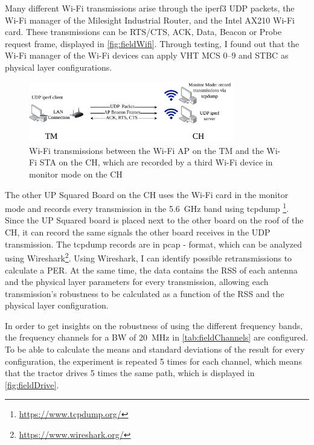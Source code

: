 Many different Wi-Fi transmissions arise through the iperf3 \ac{UDP} packets, the Wi-Fi manager of the Milesight Industrial Router, and the Intel AX210 Wi-Fi card.
These transmissions can be RTS/CTS, ACK, Data, Beacon or Probe request frame, displayed in \autoref{fig:fieldWifi}.
Through testing, I found out that the Wi-Fi manager of the Wi-Fi devices can apply VHT \ac{MCS} \numrange{0}{9} and \ac{STBC} as physical layer configurations.

\begin{figure}[H]%
	\centering
	\includegraphics[width=0.8\textwidth]{figures/FieldExperimentwifi}
	\caption{Wi-Fi transmissions between the Wi-Fi \ac{AP} on the \acf{TM} and the Wi-Fi \ac{STA} on the \acf{CH}, which
	are recorded by a third Wi-Fi device in monitor mode on the \ac{CH}}
	\label{fig:fieldWifi}%
\end{figure}

The other UP Squared Board on the \ac{CH} uses the Wi-Fi card in the monitor mode and records every transmission in the \SI{5.6}{\giga\hertz} band using tcpdump \footnote{\url{https://www.tcpdump.org/}}.
Since the UP Squared board is placed next to the other board on the roof of the \ac{CH}, it can record the same signals the other board receives in the \ac{UDP} transmission.
The tcpdump records are in pcap - format, which can be analyzed using Wireshark\footnote{\url{https://www.wireshark.org/}}.
Using Wireshark, I can identify possible retransmissions to calculate a \ac{PER}.
At the same time, the data contains the \ac{RSS} of each antenna and the physical layer parameters for every
transmission, allowing each transmission's robustness to be calculated as a function of the \ac{RSS} and the physical
layer configuration.

In order to get insights on the robustness of using the different frequency bands, the frequency channels for a \ac{BW} of \SI{20}{\mega\hertz} in \autoref{tab:fieldChannels} are configured.
To be able to calculate the means and standard deviations of the result for every configuration, the experiment is repeated \num{5} times for each channel,
which means that the tractor drives \num{5} times the same path, which is displayed in \autoref{fig:fieldDrive}.

